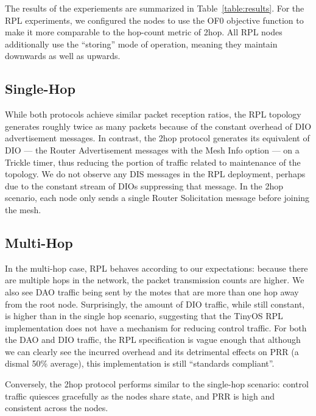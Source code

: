 The results of the experiements are summarized in Table~\ref{table:results}.
For the RPL experiments, we configured the nodes to use the OF0 objective function to make it more comparable to the hop-count metric of 2hop.
All RPL nodes additionally use the ``storing'' mode of operation, meaning they maintain downwards as well as upwards.

\subsection{Single-Hop}

While both protocols achieve similar packet reception ratios, the RPL topology generates roughly twice as many packets because of the constant overhead of DIO advertisement messages.
In contrast, the 2hop protocol generates its equivalent of DIO --- the Router Advertisement messages with the Mesh Info option --- on a Trickle timer, thus reducing the portion of traffic related to maintenance of the topology.
We do not observe any DIS messages in the RPL deployment, perhaps due to the constant stream of DIOs suppressing that message.
In the 2hop scenario, each node only sends a single Router Solicitation message before joining the mesh.

\subsection{Multi-Hop}

In the multi-hop case, RPL behaves according to our expectations: because there are multiple hops in the network, the packet transmission counts are higher.
We also see DAO traffic being sent by the motes that are more than one hop away from the root node.
Surprisingly, the amount of DIO traffic, while still constant, is higher than in the single hop scenario, suggesting that the TinyOS RPL implementation does not have a mechanism for reducing control traffic.
For both the DAO and DIO traffic, the RPL specification is vague enough that although we can clearly see the incurred overhead and its detrimental effects on PRR (a dismal 50\% average), this implementation is still ``standards compliant''.

Conversely, the 2hop protocol performs similar to the single-hop scenario: control traffic quiesces gracefully as the nodes share state, and PRR is high and consistent across the nodes.

